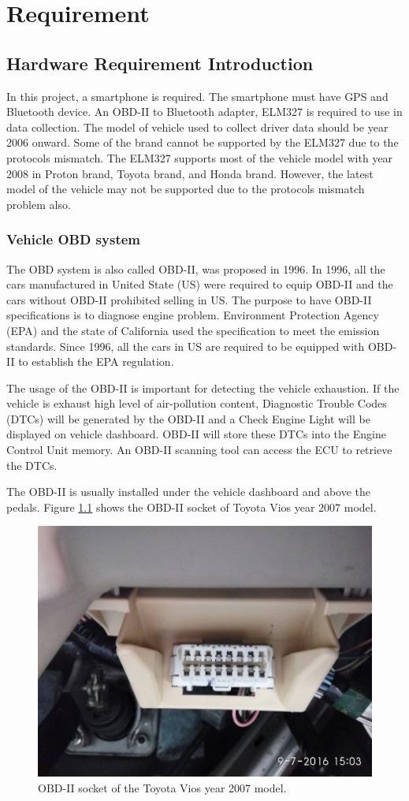 \chapter{Requirement}
\section{Hardware Requirement Introduction}
In this project, a smartphone is required. The smartphone must have GPS and Bluetooth device. An OBD-II to Bluetooth adapter, ELM327 is required to use in data collection. The model of vehicle used to collect driver data should be year 2006 onward. Some of the brand cannot be supported by the ELM327 due to the protocols mismatch. The ELM327 supports most of the vehicle model with year 2008 in Proton brand, Toyota brand, and Honda brand. However, the latest model of the vehicle may not be supported due to the protocols mismatch problem also.

\subsection{Vehicle OBD system}
The OBD system is also called OBD-II, was proposed in 1996. In 1996, all the cars manufactured in United State (US) were required to equip OBD-II and the cars without OBD-II prohibited selling in US. The purpose to have OBD-II specifications is to diagnose engine problem. Environment Protection Agency (EPA) and the state of California used the specification to meet the emission standards. Since 1996, all the cars in US are required to be equipped with OBD-II to establish the EPA regulation. 

The usage of the OBD-II is important for detecting the vehicle exhaustion. If the vehicle is exhaust high level of air-pollution content, Diagnostic Trouble Codes (DTCs) will be generated by the OBD-II and a Check Engine Light will be displayed on vehicle dashboard. OBD-II will store these DTCs into the  Engine Control Unit memory. An OBD-II scanning tool can access the ECU to retrieve the DTCs.

The OBD-II is usually installed under the vehicle dashboard and above the pedals. Figure \ref{fig:obd} shows the OBD-II socket of Toyota Vios year 2007 model.

\begin{figure}[hbt!]\centering
\includegraphics[width=.75\textwidth]{image/obd}
\caption{OBD-II socket of the Toyota Vios year 2007 model.}
\label{fig:obd}
\end{figure}

